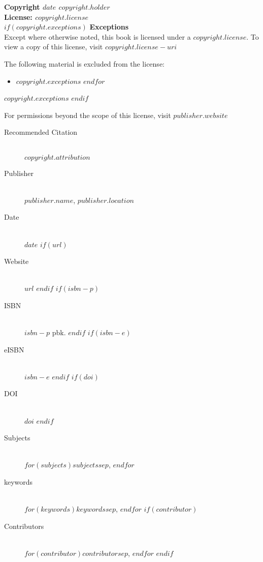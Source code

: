 \documentclass{book}
\newcommand{\booklicense}{\href{$copyright.license-uri$}{$copyright.license$}}
\begin{document}
\begin{flushleft}

\textbf{Copyright \textcopyright{} $date$  $copyright.holder$\\
License: \booklicense}\\[11pt] 

$if(copyright.exceptions)$
\textbf{Exceptions} \\

Except where otherwise noted, this book is licensed under a $copyright.license$. To view a copy of this license, visit $copyright.license-uri$

The following material is excluded from the license: 

\begin{itemize}
  $for(copyright.exceptions)$
  \item $copyright.exceptions$
  $endfor$
\end{itemize}

$copyright.exceptions$
$endif$

For permissions beyond the scope of this license, visit $publisher.website$

\vspace*{\fill}

\begin{description}
  \item[Recommended Citation] \hfill \\ $copyright.attribution$
  \item[Publisher] \hfill \\ $publisher.name$, $publisher.location$
  \item[Date] \hfill \\ $date$
  $if(url)$
  \item[Website] \hfill \\ $url$
  $endif$
  $if(isbn-p)$
  \item[ISBN] \hfill \\ $isbn-p$ pbk.
  $endif$
  $if(isbn-e)$
  \item[eISBN] \hfill \\ $isbn-e$
  $endif$
  $if(doi)$
  \item[DOI] \hfill \\ \href{https://doi.org/$doi$}{$doi$}
  $endif$
  \item[Subjects] \hfill \\ $for(subjects)$$subjects$$sep$, $endfor$
  \item[keywords] \hfill \\ $for(keywords)$$keywords$$sep$, $endfor$
  $if(contributor)$
  \item[Contributors] \hfill \\ $for(contributor)$$contributor$$sep$, $endfor$
  $endif$


\end{description}
\end{flushleft}
\end{document}
